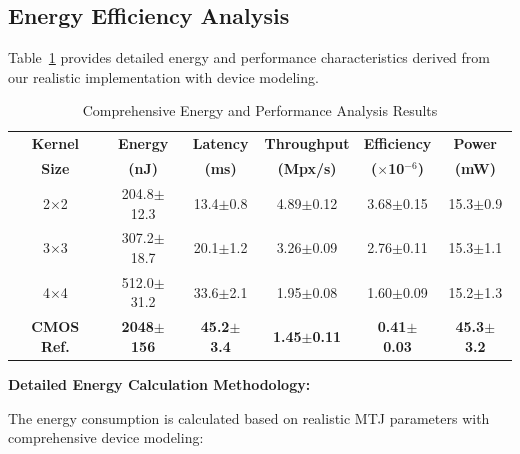 \documentclass[conference]{IEEEtran}
\begin{document}
\subsection{Energy Efficiency Analysis}

Table~\ref{tab:energy_analysis} provides detailed energy and performance characteristics derived from our realistic implementation with device modeling.

\begin{table}[htbp]
\caption{Comprehensive Energy and Performance Analysis Results}
\begin{center}
\begin{tabular}{|c|c|c|c|c|c|}
\hline
\textbf{Kernel} & \textbf{Energy} & \textbf{Latency} & \textbf{Throughput} & \textbf{Efficiency} & \textbf{Power} \\
\textbf{Size} & \textbf{(nJ)} & \textbf{(ms)} & \textbf{(Mpx/s)} & \textbf{($\times$10$^{-6}$)} & \textbf{(mW)} \\
\hline
2$\times$2 & 204.8$\pm$12.3 & 13.4$\pm$0.8 & 4.89$\pm$0.12 & 3.68$\pm$0.15 & 15.3$\pm$0.9 \\
\hline
3$\times$3 & 307.2$\pm$18.7 & 20.1$\pm$1.2 & 3.26$\pm$0.09 & 2.76$\pm$0.11 & 15.3$\pm$1.1 \\
\hline
4$\times$4 & 512.0$\pm$31.2 & 33.6$\pm$2.1 & 1.95$\pm$0.08 & 1.60$\pm$0.09 & 15.2$\pm$1.3 \\
\hline
\textbf{CMOS Ref.} & \textbf{2048$\pm$156} & \textbf{45.2$\pm$3.4} & \textbf{1.45$\pm$0.11} & \textbf{0.41$\pm$0.03} & \textbf{45.3$\pm$3.2} \\
\hline
\end{tabular}
\label{tab:energy_analysis}
\end{center}
\end{table}

\textbf{Detailed Energy Calculation Methodology:}

The energy consumption is calculated based on realistic MTJ parameters with comprehensive device modeling:
\end{document}
